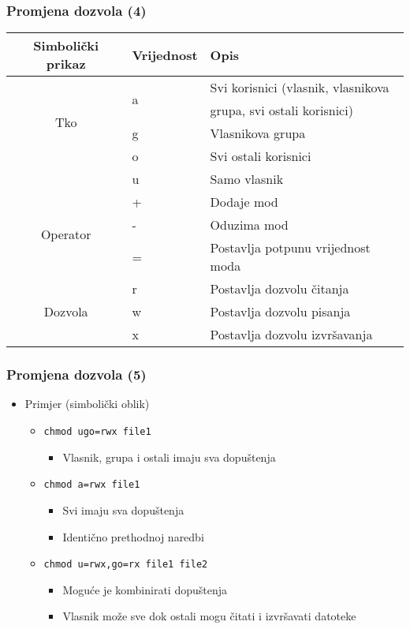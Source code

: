 \documentclass[table,usenames,dvipsnames]{beamer}
\newcommand{\shell}[1]{\texttt{#1}}
\begin{document}
\begin{frame}[t]
\frametitle{Promjena dozvola (4)}
  \begin{table}[h]
  \begin{tabular}{|c|l|l|}
    \hline
    \rowcolor{BlueViolet!20}Simbolički prikaz & Vrijednost & Opis       \\
    \hline
    \multirow{4}{*}{Tko} & \multirow{2}{*}{a} & Svi korisnici (vlasnik, 
           vlasnikova \\  & & grupa, svi ostali korisnici) \\ \cline{2-3}
                          & g & Vlasnikova grupa \\ \cline{2-3}
                          & o & Svi ostali korisnici \\ \cline{2-3}
                          & u & Samo vlasnik \\ \hline

    \multirow{3}{*}{Operator} & + & Dodaje mod \\ \cline{2-3}
                              & - & Oduzima mod \\ \cline{2-3}
     & = & Postavlja potpunu vrijednost moda\\ \hline 
    \multirow{3}{*}{Dozvola} & r & Postavlja dozvolu čitanja \\ \cline{2-3}
                             & w & Postavlja dozvolu pisanja \\ \cline{2-3}
     & x & Postavlja dozvolu izvršavanja\\ \hline
  \end{tabular}
  \end{table}
\end{frame}

\begin{frame}[t]
\frametitle{Promjena dozvola (5)}
\begin{itemize}
  \item Primjer (simbolički oblik)
  \begin{itemize}
    \item[] \shell{chmod ugo=rwx file1}
    \begin{itemize}
      \item Vlasnik, grupa i ostali imaju sva dopuštenja
    \end{itemize}
    \item[] \shell{chmod a=rwx file1}
    \begin{itemize}
      \item Svi imaju sva dopuštenja
      \item Identično prethodnoj naredbi
    \end{itemize}
    \item[] \shell{chmod u=rwx,go=rx file1 file2}
    \begin{itemize}
      \item Moguće je kombinirati dopuštenja
      \item Vlasnik može sve dok ostali mogu čitati i izvršavati datoteke
    \end{itemize}
  \end{itemize}
\end{itemize}
\end{frame}
   
\end{document}
